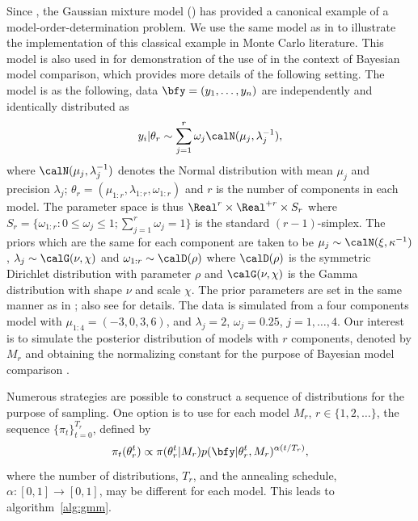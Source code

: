 \documentclass[11pt, bib, hyper, mint, minted=cache]{marticle}
\begin{document}
Since \textcite{Richardson:1997ea}, the Gaussian mixture model (\gmm) has
provided a canonical example of a model-order-determination problem. We use
the same model as in \textcite{DelMoral:2006hc} to illustrate the
implementation of this classical example in Monte Carlo literature. This model
is also used in \textcite{Zhou2013mc} for demonstration of the use of \smc in
the context of Bayesian model comparison, which provides more details of the
following setting. The model is as the following, data $\bfy =
(y_1,\dots,y_n)$ are independently and identically distributed as
\begin{equation*}
  y_i|\theta_r \sim \sum_{j=1}^r \omega_j\calN(\mu_j,\lambda_j^{-1}),
\end{equation*}
where $\calN(\mu_j,\lambda_j^{-1})$ denotes the Normal distribution with mean
$\mu_j$ and precision $\lambda_j$; $\theta_r =
(\mu_{1:r},\lambda_{1:r},\omega_{1:r})$ and $r$ is the number of components in
each model. The parameter space is thus $\Real^r\times\Real^{+r}\times S_r$
where $S_r = \{\omega_{1:r}:0\le\omega_j\le1; \sum_{j=1}^r\omega_j=1\}$ is the
standard $(r-1)$-simplex. The priors which are the same for each component are
taken to be $\mu_j\sim\calN(\xi,\kappa^{-1})$, $\lambda_j\sim\calG(\nu,\chi)$
and $\omega_{1:r}\sim\calD(\rho)$ where $\calD(\rho)$ is the symmetric
Dirichlet distribution with parameter $\rho$ and $\calG(\nu,\chi)$ is the
Gamma distribution with shape $\nu$ and scale $\chi$. The prior parameters are
set in the same manner as in \textcite{Richardson:1997ea}; also see
\textcite{Zhou2013mc} for details. The data is simulated from a four
components model with $\mu_{1:4} = (-3, 0,3, 6)$, and $\lambda_j =2$,
$\omega_j = 0.25$, $j = 1,\dots,4$. Our interest is to simulate the posterior
distribution of models with $r$ components, denoted by $M_r$ and obtaining the
normalizing constant for the purpose of Bayesian model comparison
\textcite[chap.~7]{Robert:2007tc}.

Numerous strategies are possible to construct a sequence of distributions for
the purpose of \smc sampling. One option is to use for each model $M_r$,
$r\in\{1,2,\dots\}$, the sequence $\{\pi_t\}_{t=0}^{T_r}$, defined by
\begin{equation}
  \pi_t(\theta_r^t) \propto
  \pi(\theta_r^t|M_r)p(\bfy|\theta_r^t,M_r)^{\alpha(t/T_r)},
  \label{eq:geometry}
\end{equation}
where the number of distributions, $T_r$, and the annealing schedule,
$\alpha:[0,1]\to[0,1]$, may be different for each model. This leads to
algorithm~\ref{alg:gmm}.
\end{document}
